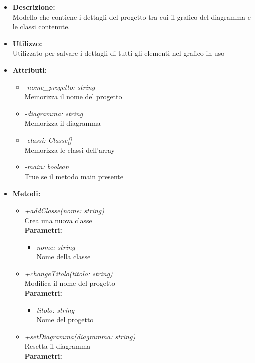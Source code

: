 \begin{itemize}
	\item \textbf{Descrizione:}\\
	Modello che contiene i dettagli del progetto tra cui il grafico del diagramma e le classi contenute.
	\item \textbf{Utilizzo:}\\
	Utilizzato per salvare i dettagli di tutti gli elementi nel grafico in uso
	\item \textbf{Attributi:}
		\begin{itemize}
			\item \emph{-nome\_progetto: string}\\
			Memorizza il nome del progetto
			\item \emph{-diagramma: string}\\
			Memorizza il diagramma
			\item \emph{-classi: Classe[]}\\
			Memorizza le classi dell'array
			\item \emph{-main: boolean}\\
			True se il metodo main presente
		\end{itemize}
	\item \textbf{Metodi:}
		\begin{itemize}
			\item \emph{+addClasse(nome: string)}\\
    		Crea una nuova classe\\
    		\textbf{Parametri:}
    		\begin{itemize}
    			\item \emph{nome: string}\\
    			Nome della classe
    		\end{itemize}
    		\item \emph{+changeTitolo(titolo: string)}\\
    		Modifica il nome del progetto\\
    		\textbf{Parametri:}
    		\begin{itemize}
    			\item \emph{titolo: string}\\
    			Nome del progetto
    		\end{itemize}
    		\item \emph{+setDiagramma(diagramma: string)}\\
    		Resetta il diagramma\\
    		\textbf{Parametri:}
    		\begin{itemize}

\end{itemize}
\end{itemize}
\end{itemize}
